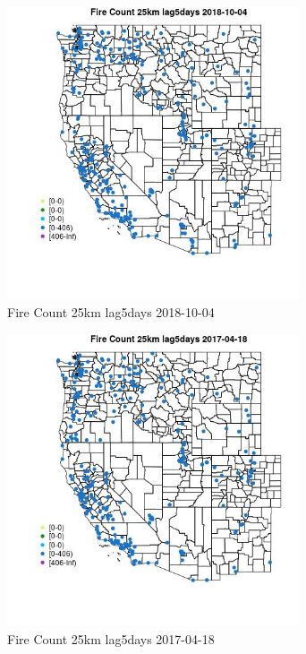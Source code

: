 \begin{figure} 
\centering  
\includegraphics[width=0.77\textwidth]{Code_Outputs/Report_ML_input_PM25_Step4_part_f_de_duplicated_aves_prioritize_24hr_obswNAs_MapObsFire_Count_25km_lag5days2018-10-04.jpg} 
\caption{\label{fig:Report_ML_input_PM25_Step4_part_f_de_duplicated_aves_prioritize_24hr_obswNAsMapObsFire_Count_25km_lag5days2018-10-04}Fire Count 25km lag5days 2018-10-04} 
\end{figure} 
 

\begin{figure} 
\centering  
\includegraphics[width=0.77\textwidth]{Code_Outputs/Report_ML_input_PM25_Step4_part_f_de_duplicated_aves_prioritize_24hr_obswNAs_MapObsFire_Count_25km_lag5days2017-04-18.jpg} 
\caption{\label{fig:Report_ML_input_PM25_Step4_part_f_de_duplicated_aves_prioritize_24hr_obswNAsMapObsFire_Count_25km_lag5days2017-04-18}Fire Count 25km lag5days 2017-04-18} 
\end{figure} 
 

